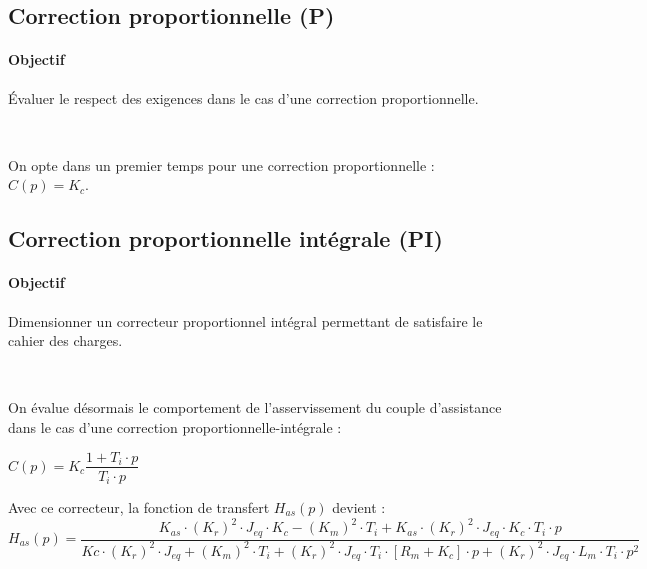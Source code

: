 

\subsection{Correction proportionnelle (P)}

\paragraph{Objectif} Évaluer le respect des exigences dans le cas d’une correction proportionnelle.

~\

On opte dans un premier temps pour une correction proportionnelle : $C(p)=K_c$.



\subsection{Correction proportionnelle intégrale (PI)}

\paragraph{Objectif} Dimensionner un correcteur proportionnel intégral permettant de satisfaire le cahier des charges.

~\

On évalue désormais le comportement de l’asservissement du couple d’assistance dans le cas d’une correction
proportionnelle-intégrale :

\begin{center}
$C(p)=K_c\dfrac{1+T_i\cdot p}{T_i\cdot p}$
\end{center}

Avec ce correcteur, la fonction de transfert $H_{as}(p)$ devient :
$$H_{as}(p)=\dfrac{K_{as}\cdot(K_r)^2\cdot J_{eq}\cdot K_c - (K_m)^2\cdot T_i + K_{as}\cdot (K_r)^2\cdot J_{eq} \cdot K_c\cdot T_i\cdot p}{Kc\cdot (K_r)^2\cdot J_{eq}+(K_m)^2\cdot T_i+(K_r)^2\cdot J_{eq}\cdot T_i\cdot \left[R_m+K_c\right]\cdot p+ (K_r)^2\cdot J_{eq}\cdot L_m\cdot T_i\cdot p^2}$$

